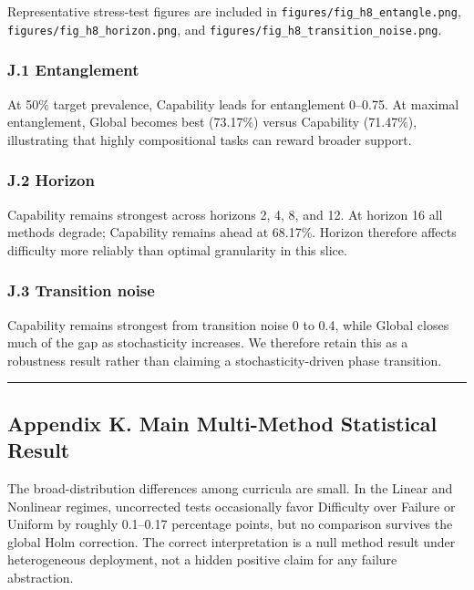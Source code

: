 \documentclass[
]{article}
\begin{document}
Representative stress-test figures are included in
\texttt{figures/fig\_h8\_entangle.png},
\texttt{figures/fig\_h8\_horizon.png}, and
\texttt{figures/fig\_h8\_transition\_noise.png}.

\subsubsection{J.1 Entanglement}\label{j.1-entanglement}

At 50\% target prevalence, Capability leads for entanglement 0--0.75. At
maximal entanglement, Global becomes best (73.17\%) versus Capability
(71.47\%), illustrating that highly compositional tasks can reward
broader support.

\subsubsection{J.2 Horizon}\label{j.2-horizon}

Capability remains strongest across horizons 2, 4, 8, and 12. At horizon
16 all methods degrade; Capability remains ahead at 68.17\%. Horizon
therefore affects difficulty more reliably than optimal granularity in
this slice.

\subsubsection{J.3 Transition noise}\label{j.3-transition-noise}

Capability remains strongest from transition noise 0 to 0.4, while
Global closes much of the gap as stochasticity increases. We therefore
retain this as a robustness result rather than claiming a
stochasticity-driven phase transition.

\begin{center}\rule{0.5\linewidth}{0.5pt}\end{center}

\subsection{Appendix K. Main Multi-Method Statistical
Result}\label{appendix-k.-main-multi-method-statistical-result}

The broad-distribution differences among curricula are small. In the
Linear and Nonlinear regimes, uncorrected tests occasionally favor
Difficulty over Failure or Uniform by roughly 0.1--0.17 percentage
points, but no comparison survives the global Holm correction. The
correct interpretation is a null method result under heterogeneous
deployment, not a hidden positive claim for any failure abstraction.
\end{document}
